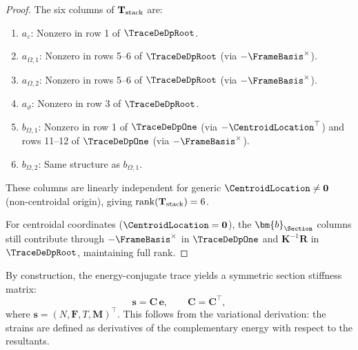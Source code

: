 \begin{proof}
The six columns of $\mathbf{T}_{\rm stack}$ are:
\begin{enumerate}
\item $a_\varepsilon$: Nonzero in row 1 of $\TraceDeDpRoot$.
\item $a_{\Omega,1}$: Nonzero in rows 5--6 of $\TraceDeDpRoot$ (via $-\FrameBasis^\times$).
\item $a_{\Omega,2}$: Nonzero in rows 5--6 of $\TraceDeDpRoot$ (via $-\FrameBasis^\times$).
\item $a_\vartheta$: Nonzero in row 3 of $\TraceDeDpRoot$.
\item $b_{\Omega,1}$: Nonzero in row 1 of $\TraceDeDpOne$ (via $-\CentroidLocation^\top$) 
and rows 11--12 of $\TraceDeDpOne$ (via $-\FrameBasis^\times$).
\item $b_{\Omega,2}$: Same structure as $b_{\Omega,1}$.
\end{enumerate}
These columns are linearly independent for generic $\CentroidLocation \neq \mathbf{0}$ 
(non-centroidal origin), giving $\mathrm{rank}(\mathbf{T}_{\rm stack}) = 6$.

For centroidal coordinates ($\CentroidLocation = \mathbf{0}$), the $\bm{b}_{\Section}$ columns 
still contribute through $-\FrameBasis^\times$ in $\TraceDeDpOne$ and $\mathbf{K}^{-1}\mathbf{R}$ 
in $\TraceDeDpRoot$, maintaining full rank.
\end{proof}

\begin{remark}
By construction, the energy-conjugate trace yields a symmetric section 
stiffness matrix:
\begin{equation}
\bm{s} = \mathbf{C}\,\bm{e}, \qquad \mathbf{C} = \mathbf{C}^\top,
\end{equation}
where $\bm{s} = (N, \bm{F}, T, \bm{M})^\top$. This follows from the variational 
derivation: the strains are defined as derivatives of the complementary 
energy with respect to the resultants.
\end{remark}

